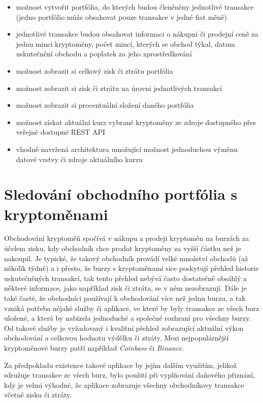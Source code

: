 \documentclass[12pt, a4paper]{article}
\let\oldsection\section
\renewcommand\section{\clearpage\oldsection}
\begin{document}
\begin{itemize}
    \item možnost vytvořit portfólia, do kterých budou členěněny jednotlivé transakce (jedno portfólio může obsahovat pouze transakce v jedné fiat měně)
    \item jednotlivé transakce budou obsahovat informaci o nákupní či prodejní ceně za jednu minci kryptoměny, počet mincí, kterých se obchod týkal, datum uskutečnění obchodu a poplatek za jeho zprostředkování
    \item možnost zobrazit si celkový zisk či ztrátu portfólia 
    \item možnost zobrazit si zisk či ztrátu na úrovni jednotlivých transakcí
    \item možnost zobrazit si procentuální složení daného portfólia
    \item možnost získat aktuální kurz vybrané kryptoměny ze zdroje dostupného přes veřejně dostupné REST API 
    \item vhodně navržená architektura umožující možnost jednoduchou výměnu datové vrstvy či zdroje aktuálního kurzu
\end{itemize}

    
\section{Sledování obchodního portfólia s kryptoměnami}

Obchodování kryptoměň spočívá v nákupu a prodeji kryptoměn na burzách za účelem zisku, kdy obchodník chce prodat kryptoměny za vyšší částku než je nakoupil. Je typické, že takový obchodník provádí velké množství obchodů (až několik týdně) a i přesto, že burzy s kryptoměnami sice poskytují přehled historie uskutečněných transakcí, tak tento přehled nebývá často dostatečně obsáhlý a některé informace, jako například zisk či ztráta, se v něm nezobrazují. Dále je také časté, že obchodníci používají k obchodování více než jednu burzu, a tak vzniká potřeba nějaké služby či aplikace, ve které by byly transakce ze všech burz uložené, a která by nabízela jednoduché a společné rozhraní pro všechny burzy. Od takové služby je vyžadovaný i kvalitní přehled zobrazující aktuální výkon obchodování a celkovou hodnotu výdělku či ztráty. Mezi nejpopulárnější kryptoměnové burzy patří například \textit{Coinbase} či \textit{Binance}. 

Za předpokladu existence takové aplikace by jejím dalším využitím, jelikož sdružuje transakce ze všech burz, bylo použití při vyplňování daňového přiznání, kdy je velmi výhodné, že aplikace zobrazuje všechny obchodníkovy transakce včetně zisku či ztráty.  
\end{document}
